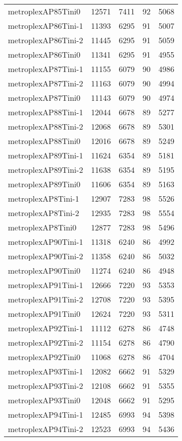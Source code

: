 \documentclass[../../../thesis.tex]{subfiles}
\begin{document}
\begin{longtable}{lrrrr}
metroplexAP85Tini0 & 12571 & 7411 & 92 & 5068 \\
metroplexAP86Tini-1 & 11393 & 6295 & 91 & 5007 \\
metroplexAP86Tini-2 & 11445 & 6295 & 91 & 5059 \\
metroplexAP86Tini0 & 11341 & 6295 & 91 & 4955 \\
metroplexAP87Tini-1 & 11155 & 6079 & 90 & 4986 \\
metroplexAP87Tini-2 & 11163 & 6079 & 90 & 4994 \\
metroplexAP87Tini0 & 11143 & 6079 & 90 & 4974 \\
metroplexAP88Tini-1 & 12044 & 6678 & 89 & 5277 \\
metroplexAP88Tini-2 & 12068 & 6678 & 89 & 5301 \\
metroplexAP88Tini0 & 12016 & 6678 & 89 & 5249 \\
metroplexAP89Tini-1 & 11624 & 6354 & 89 & 5181 \\
metroplexAP89Tini-2 & 11638 & 6354 & 89 & 5195 \\
metroplexAP89Tini0 & 11606 & 6354 & 89 & 5163 \\
metroplexAP8Tini-1 & 12907 & 7283 & 98 & 5526 \\
metroplexAP8Tini-2 & 12935 & 7283 & 98 & 5554 \\
metroplexAP8Tini0 & 12877 & 7283 & 98 & 5496 \\
metroplexAP90Tini-1 & 11318 & 6240 & 86 & 4992 \\
metroplexAP90Tini-2 & 11358 & 6240 & 86 & 5032 \\
metroplexAP90Tini0 & 11274 & 6240 & 86 & 4948 \\
metroplexAP91Tini-1 & 12666 & 7220 & 93 & 5353 \\
metroplexAP91Tini-2 & 12708 & 7220 & 93 & 5395 \\
metroplexAP91Tini0 & 12624 & 7220 & 93 & 5311 \\
metroplexAP92Tini-1 & 11112 & 6278 & 86 & 4748 \\
metroplexAP92Tini-2 & 11154 & 6278 & 86 & 4790 \\
metroplexAP92Tini0 & 11068 & 6278 & 86 & 4704 \\
metroplexAP93Tini-1 & 12082 & 6662 & 91 & 5329 \\
metroplexAP93Tini-2 & 12108 & 6662 & 91 & 5355 \\
metroplexAP93Tini0 & 12048 & 6662 & 91 & 5295 \\
metroplexAP94Tini-1 & 12485 & 6993 & 94 & 5398 \\
metroplexAP94Tini-2 & 12523 & 6993 & 94 & 5436 \\

\end{longtable}
\end{document}
